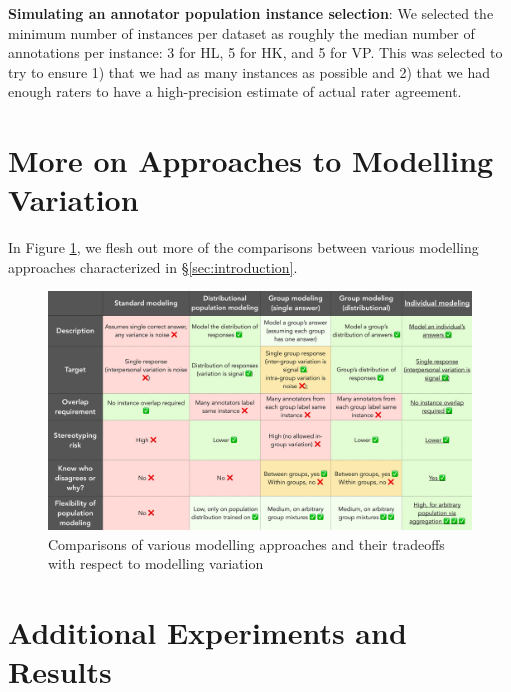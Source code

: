 \documentclass[11pt]{article}
\begin{document}
\textbf{Simulating an annotator population instance selection}: We selected the minimum number of instances per dataset as roughly the median number of annotations per instance: 3 for HL, 5 for HK, and 5 for VP. This was selected to try to ensure 1) that we had as many instances as possible and 2) that we had enough raters to have a high-precision estimate of actual rater agreement.


\section{More on Approaches to Modelling Variation}
\label{app:modellingvariation}

In Figure \ref{fig:modellingvariation}, we flesh out more of the comparisons between various modelling approaches characterized in \S \ref{sec:introduction}.



\begin{figure}[h]
\centering
\includegraphics[width=\textwidth]{files/modelingvariation.pdf}
\caption{Comparisons of various modelling approaches and their tradeoffs with respect to modelling variation}
\label{fig:modellingvariation}
\end{figure}


\section{Additional Experiments and Results}
\label{app:additionalexperiments}
\end{document}
